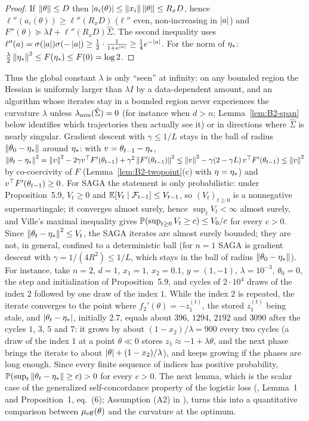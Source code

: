 \begin{proof}
If $\left\|\theta\right\|\le D$ then $\left|a_i(\theta)\right|\le\left\|x_i\right\|\left\|\theta\right\|\le R_xD$, hence
$\ell''(a_i(\theta))\ge\ell''(R_xD)$ ($\ell''$ even, non-increasing in $\left|a\right|$) and
$F''(\theta)\succcurlyeq\lambda I+\ell''(R_xD)\hat\Sigma$. The second inequality uses
$\ell''(a)=\sigma(\left|a\right|)\sigma(-\left|a\right|)\ge\frac12\cdot\frac1{1+e^{\left|a\right|}}\ge\frac14e^{-\left|a\right|}$.
For the norm of $\eta_\ast$: $\frac\lambda2\left\|\eta_\ast\right\|^2\le F(\eta_\ast)\le F(0)=\log2$.
\end{proof}

Thus the global constant $\lambda$ is only ``seen'' at infinity: on any bounded region the Hessian is
uniformly larger than $\lambda I$ by a data-dependent amount, and an algorithm whose iterates stay in a
bounded region never experiences the curvature $\lambda$ unless $\lambda_{\min}(\hat\Sigma)=0$ (for instance when $d>n$;
Lemma~\ref{lem:B2-span} below identifies which trajectories then actually see it) or in directions where
$\hat\Sigma$ is nearly singular. Gradient descent with $\gamma\le1/L$ stays in the ball of radius
$\left\|\theta_0-\eta_\ast\right\|$ around $\eta_\ast$: with $v=\theta_{t-1}-\eta_\ast$,
$\left\|\theta_t-\eta_\ast\right\|^2=\left\|v\right\|^2-2\gamma v^\top F'(\theta_{t-1})+\gamma^2\left\|F'(\theta_{t-1})\right\|^2\le\left\|v\right\|^2-\gamma(2-\gamma L)\,v^\top F'(\theta_{t-1})\le\left\|v\right\|^2$
by co-coercivity of $F$ (Lemma~\ref{lem:B2-twopoint}(c) with $\eta=\eta_\ast$) and $v^\top F'(\theta_{t-1})\ge0$.
For SAGA the statement is only probabilistic: under Proposition~5.9, $V_t\ge0$ and $\mathbb{E}[V_t\mid\mathcal F_{t-1}]\le V_{t-1}$,
so $(V_t)_{t\ge0}$ is a nonnegative supermartingale; it converges almost surely, hence $\sup_tV_t<\infty$ almost surely,
and Ville's maximal inequality gives $\mathbb{P}(\sup_{t\ge0}V_t\ge c)\le V_0/c$ for every $c>0$. Since
$\left\|\theta_t-\eta_\ast\right\|^2\le V_t$, the SAGA iterates are almost surely bounded; they are not, in general, confined to a
deterministic ball (for $n=1$ SAGA is gradient descent with $\gamma=1/(4R^2)\le1/L$, which stays in the ball of radius
$\left\|\theta_0-\eta_\ast\right\|$). For instance, take $n=2$, $d=1$, $x_1=1$, $x_2=0.1$, $y=(1,-1)$, $\lambda=10^{-3}$,
$\theta_0=0$, the step and initialization of Proposition~5.9, and cycles of $2\cdot10^4$ draws of the index $2$ followed
by one draw of the index $1$. While the index $2$ is repeated, the iterate converges to the point where
$f_2'(\theta)=-z_1^{(t)}$, the stored $z_1^{(t)}$ being stale, and $\left|\theta_t-\eta_\ast\right|$, initially $2.7$, equals
about $396$, $1294$, $2192$ and $3090$ after the cycles $1$, $3$, $5$ and $7$: it grows by about $(1-x_2)/\lambda=900$
every two cycles (a draw of the index $1$ at a point $\theta\ll0$ stores $z_1\approx-1+\lambda\theta$, and the next
phase brings the iterate to about $\left|\theta\right|+(1-x_2)/\lambda$), and keeps growing if the phases are long enough. Since
every finite sequence of indices has positive probability, $\mathbb{P}(\sup_t\left\|\theta_t-\eta_\ast\right\|\ge c)>0$ for every
$c>0$. The next lemma, which is the scalar case of the generalized
self-concordance property of the logistic loss (\cite{bach2010self}, Lemma~1 and Proposition~1, eq.~(6);
Assumption (A2) in \cite{bach2014adaptivity}), turns this into a quantitative comparison between
$\mu_{\mathrm{eff}}(\theta)$ and the curvature at the optimum.

